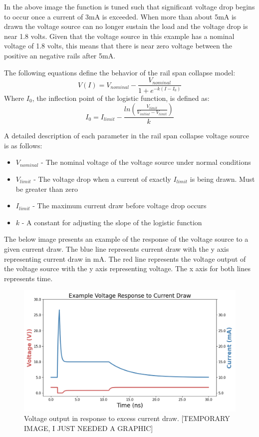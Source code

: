 \documentclass[conference]{IEEEtran}
\begin{document}
In the above image the function is tuned such that significant voltage drop begins to occur once a current of 3mA is exceeded. When more than about 5mA is drawn the voltage source can no longer sustain the load and the voltage drop is near 1.8 volts. Given that the voltage source in this example has a nominal voltage of 1.8 volts, this means that there is near zero voltage between the positive an negative rails after 5mA.

The following equations define the behavior of the rail span collapse model:
{\Large
\[V(I)=V_{nominal}-\frac{V_{nominal}}{1+e^{-k(I-I_0)}}\]
}
Where \(I_0\), the inflection point of the logistic function, is defined as:
{\Large
\[I_0=I_{limit}-\frac{ln(\frac{V_{limit}}{V_{initial}-V_{limit}})}{k}\]
}

A detailed description of each parameter in the rail span collapse voltage source is as follows:

\begin{itemize}

\item[] \(V_{nominal}\) - The nominal voltage of the voltage source under normal conditions

\item[] \(V_{limit}\) - The voltage drop when a current of exactly \(I_{limit}\) is being drawn. Must be greater than zero

\item[] \(I_{limit}\) - The maximum current draw before voltage drop occurs

\item[] \(k\) - A constant for adjusting the slope of the logistic function

\end{itemize}
\vspace{1em}

The below image presents an example of the response of the voltage source to a given current draw. The blue line represents current draw with the y axis representing current draw in mA. The red line represents the voltage output of the voltage source with the y axis representing voltage. The x axis for both lines represents time.

\begin{figure}[htbp]
\centering
\includegraphics[width=0.95\linewidth]{Rail_Collapse_Response.png}
\caption{Voltage output in response to excess current draw. [TEMPORARY IMAGE, I JUST NEEDED A GRAPHIC]}
\label{fig:rail_collapse_response}
\end{figure}
\end{document}
